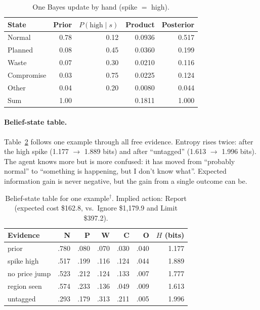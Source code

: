\documentclass{article}
\newcommand{\hyp}{$^{\dagger}$}
\begin{document}
\begin{table}[t]\centering\small
\begin{tabular}{lrrrr}\toprule
State & Prior & $P(\text{high}\mid s)$ & Product & Posterior\\\midrule
Normal & 0.78 & 0.12 & 0.0936 & 0.517\\
Planned & 0.08 & 0.45 & 0.0360 & 0.199\\
Waste & 0.07 & 0.30 & 0.0210 & 0.116\\
Compromise & 0.03 & 0.75 & 0.0225 & 0.124\\
Other & 0.04 & 0.20 & 0.0080 & 0.044\\\midrule
Sum & 1.00 & & 0.1811 & 1.000\\\bottomrule
\end{tabular}
\caption{One Bayes update by hand (spike $=$ high).}\label{tab:bayes}
\end{table}

\paragraph{Belief-state table.} Table~\ref{tab:belief} follows one example through all free evidence. Entropy rises twice: after the high spike (1.177 $\rightarrow$ 1.889 bits) and after ``untagged'' (1.613 $\rightarrow$ 1.996 bits). The agent knows more but is more confused: it has moved from ``probably normal'' to ``something is happening, but I don't know what''. Expected information gain is never negative, but the gain from a single outcome can be.

\begin{table}[t]\centering\small\setlength{\tabcolsep}{3.5pt}
\begin{tabular}{lrrrrrr}\toprule
Evidence & N & P & W & C & O & $H$ (bits)\\\midrule
prior & .780 & .080 & .070 & .030 & .040 & 1.177\\
spike high & .517 & .199 & .116 & .124 & .044 & 1.889\\
no price jump & .523 & .212 & .124 & .133 & .007 & 1.777\\
region seen & .574 & .233 & .136 & .049 & .009 & 1.613\\
untagged & .293 & .179 & .313 & .211 & .005 & 1.996\\\bottomrule
\end{tabular}
\caption{Belief-state table for one example\hyp. Implied action: Report (expected cost \$162.8, vs.\ Ignore \$1,179.9 and Limit \$397.2).}\label{tab:belief}
\end{table}
\end{document}
